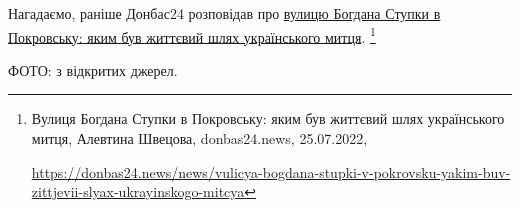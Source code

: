 Нагадаємо, раніше Донбас24 розповідав про \href{https://donbas24.news/news/vulicya-bogdana-stupki-v-pokrovsku-yakim-buv-zittjevii-slyax-ukrayinskogo-mitcya}{%
вулицю Богдана Ступки в Покровську: яким був життєвий шлях українського митця}.%
\footnote{Вулиця Богдана Ступки в Покровську: яким був життєвий шлях українського митця, Алевтина Швецова, donbas24.news, 25.07.2022, %
\par\url{https://donbas24.news/news/vulicya-bogdana-stupki-v-pokrovsku-yakim-buv-zittjevii-slyax-ukrayinskogo-mitcya}}

ФОТО: з відкритих джерел.


